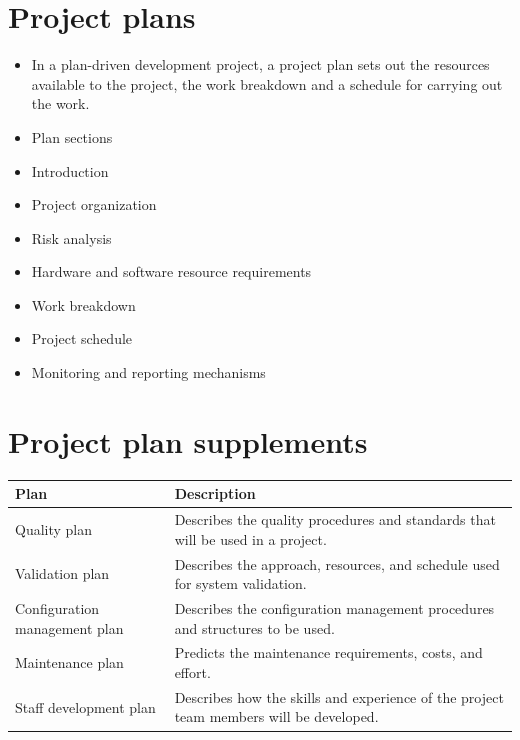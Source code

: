  \section{Project plans}
 \begin{itemize}

\item In a plan-driven development project, a project plan sets out the resources available to the project, the work breakdown and a schedule for carrying out the work.

\item Plan sections   \item Introduction   \item Project organization   \item Risk analysis
  \item Hardware and software resource requirements   \item Work breakdown
  \item Project schedule

  \item Monitoring and reporting mechanisms
\end{itemize}

\section{Project plan supplements}
\begin{table}[h!]
\centering
\begin{tabular}{ |p{3cm}|p{8cm}|  }
\hline
Plan & Description \\
\hline
\hline
Quality plan & Describes the quality procedures and standards that will be used in a project.\\
\hline
Validation plan & Describes the approach, resources, and schedule used for system validation.\\
\hline
Configuration management plan & Describes the configuration management procedures and structures to be used.\\
\hline
Maintenance plan & Predicts the maintenance requirements, costs, and effort.\\
\hline
Staff development plan & Describes how the skills and experience of the project team members will be developed.\\
\hline
\end{tabular}

\label{table:T6_2}
\end{table}

